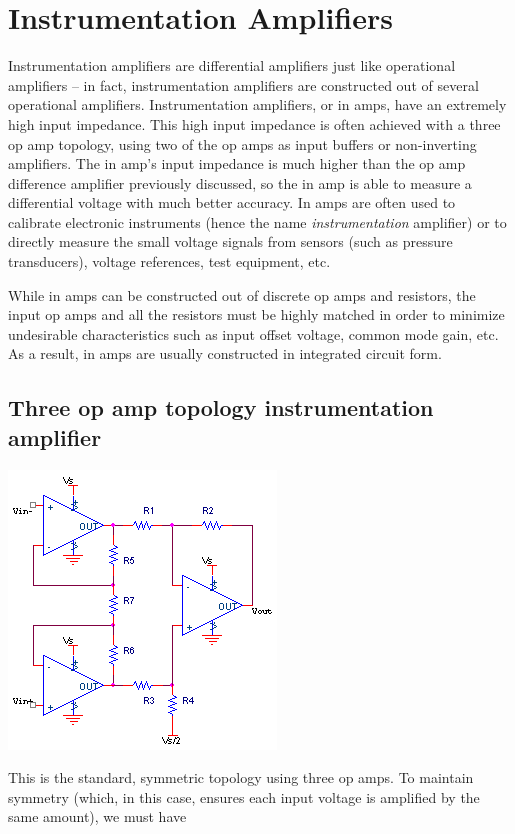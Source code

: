 \chapter{Instrumentation Amplifiers}

Instrumentation amplifiers are differential amplifiers just like operational amplifiers -- in fact, instrumentation amplifiers are constructed out of several operational amplifiers.
Instrumentation amplifiers, or in amps, have an extremely high input impedance.
This high input impedance is often achieved with a three op amp topology, using two of the op amps as input buffers or non-inverting amplifiers.
The in amp's input impedance is much higher than the op amp difference amplifier previously discussed, so the in amp is able to measure a differential voltage with much better accuracy.
In amps are often used to calibrate electronic instruments (hence the name \emph{instrumentation} amplifier) or to directly measure the small voltage signals from sensors (such as pressure transducers), voltage references, test equipment, etc.

While in amps can be constructed out of discrete op amps and resistors, the input op amps and all the resistors must be highly matched in order to minimize undesirable characteristics such as input offset voltage, common mode gain, etc.
As a result, in amps are usually constructed in integrated circuit form.

\section{Three op amp topology instrumentation amplifier}
\begin{center}
	\includegraphics{schematics/threeinamp.PNG}
\end{center}
This is the standard, symmetric topology using three op amps.
To maintain symmetry (which, in this case, ensures each input voltage is amplified by the same amount), we must have

